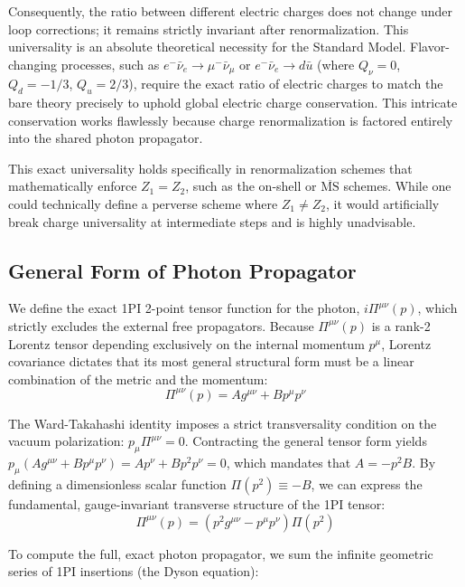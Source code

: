 Consequently, the ratio between different electric charges does not change under loop corrections; it remains strictly invariant after renormalization. This universality is an absolute theoretical necessity for the Standard Model. Flavor-changing processes, such as $e^- \bar{\nu}_e \to \mu^- \bar{\nu}_\mu$ or $e^- \bar{\nu}_e \to d \bar{u}$ (where $Q_\nu=0$, $Q_d=-1/3$, $Q_u=2/3$), require the exact ratio of electric charges to match the bare theory precisely to uphold global electric charge conservation. This intricate conservation works flawlessly because charge renormalization is factored entirely into the shared photon propagator.

\begin{remark}
    This exact universality holds specifically in renormalization schemes that mathematically enforce $Z_1 = Z_2$, such as the on-shell or $\overline{\text{MS}}$ schemes. While one could technically define a perverse scheme where $Z_1 \neq Z_2$, it would artificially break charge universality at intermediate steps and is highly unadvisable.
\end{remark}

\subsection{General Form of Photon Propagator}

We define the exact 1PI 2-point tensor function for the photon, $i\Pi^{\mu\nu}(p)$, which strictly excludes the external free propagators. Because $\Pi^{\mu\nu}(p)$ is a rank-2 Lorentz tensor depending exclusively on the internal momentum $p^\mu$, Lorentz covariance dictates that its most general structural form must be a linear combination of the metric and the momentum:
\[
    \Pi^{\mu\nu}(p) = A g^{\mu\nu} + B p^\mu p^\nu
\]

The Ward-Takahashi identity imposes a strict transversality condition on the vacuum polarization: $p_\mu \Pi^{\mu\nu} = 0$. Contracting the general tensor form yields $p_\mu (A g^{\mu\nu} + B p^\mu p^\nu) = A p^\nu + B p^2 p^\nu = 0$, which mandates that $A = -p^2 B$. By defining a dimensionless scalar function $\Pi(p^2) \equiv -B$, we can express the fundamental, gauge-invariant transverse structure of the 1PI tensor:
\[
    \Pi^{\mu\nu}(p) = (p^2 g^{\mu\nu} - p^\mu p^\nu) \Pi(p^2)
\]

To compute the full, exact photon propagator, we sum the infinite geometric series of 1PI insertions (the Dyson equation):

